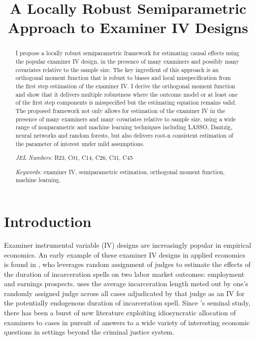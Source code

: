
\title{A Locally Robust Semiparametric Approach to Examiner IV Designs}
\maketitle
\vspace{-0.2cm}

\begin{abstract}
I propose a locally robust semiparametric framework for estimating causal effects using the popular examiner IV design, in the presence of many examiners and possibly many covariates relative to the sample size. The key ingredient of this approach is an orthogonal moment function that is robust to biases and local misspecification from the first step estimation of the examiner IV. I derive the orthogonal moment function and show that it delivers multiple robustness where the outcome model or at least one of the first step components is misspecified but the estimating equation remains valid. The proposed framework not only allows for estimation of the examiner IV in the presence of many examiners and many covariates relative to sample size, using a wide range of nonparametric and machine learning techniques including LASSO, Dantzig, neural networks and random forests, but also delivers root-n consistent estimation of the parameter of interest under mild assumptions. 
\vspace{0.1in}

\noindent \textit{JEL Numbers:} B23, C01, C14, C26, C31, C45

\noindent \textit{Keywords:} examiner IV, semiparametric estimation, orthogonal moment function, machine learning. 
\end{abstract}
\newpage 

\section{Introduction \label{sec:Introduction}}

Examiner instrumental variable (IV) designs are increasingly popular in empirical economics. An early example of these examiner IV designs in applied economics is found in \citet{10.1257/aer.96.3.863}, who leverages  random assignment of judges to estimate the effects of the duration of incarceration spells on two labor market outcomes: employment and earnings prospects. \citet{10.1257/aer.96.3.863} uses the average incarceration length meted out by one’s randomly assigned judge across all cases adjudicated by that judge as an IV for the potentially endogenous duration of incarceration spell. Since \citet{10.1257/aer.96.3.863}’s seminal study, there has been a burst of new literature exploiting idiosyncratic allocation of examiners to cases in pursuit of answers to a wide variety of interesting economic questions in settings beyond the criminal justice system.

